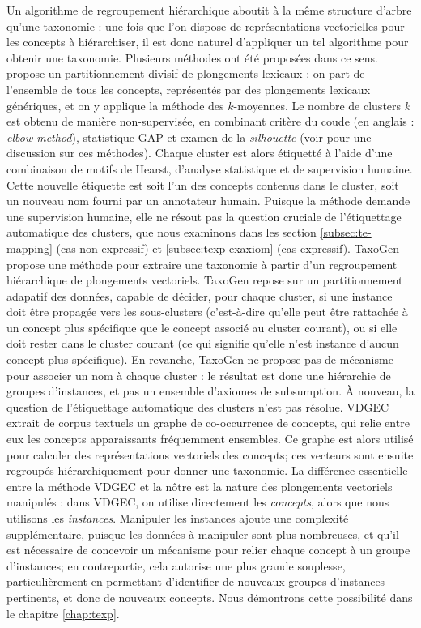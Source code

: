 Un algorithme de regroupement hiérarchique aboutit à la même structure d'arbre qu'une taxonomie : une fois que l'on dispose de représentations vectorielles pour les concepts à hiérarchiser, il est donc naturel d'appliquer un tel algorithme pour obtenir une taxonomie. Plusieurs méthodes ont été proposées dans ce sens. \cite{gupta2016domain} propose un partitionnement divisif de plongements lexicaux : on part de l'ensemble de tous les concepts, représentés par des plongements lexicaux génériques, et on y applique la méthode des $k$-moyennes. Le nombre de clusters $k$ est obtenu de manière non-supervisée, en combinant critère du coude (en anglais : \textit{elbow method}), statistique GAP et examen de la \textit{silhouette} (voir \cite[p.~126--130]{everitt2011cluster} pour une discussion sur ces méthodes). Chaque cluster est alors étiquetté à l'aide d'une combinaison de motifs de Hearst, d'analyse statistique et de supervision humaine. Cette nouvelle étiquette est soit l'un des concepts contenus dans le cluster, soit un nouveau nom fourni par un annotateur humain. Puisque la méthode demande une supervision humaine, elle ne résout pas la question cruciale de l'étiquettage automatique des clusters, que nous examinons dans les section \ref{subsec:te-mapping} (cas non-expressif) et \ref{subsec:texp-exaxiom} (cas expressif). TaxoGen \cite{zhang2018taxogen} propose une méthode pour extraire une taxonomie à partir d'un regroupement hiérarchique de plongements vectoriels. TaxoGen repose sur un partitionnement adapatif des données, capable de décider, pour chaque cluster, si une instance doit être propagée vers les sous-clusters (c'est-à-dire qu'elle peut être rattachée à un concept plus spécifique que le concept associé au cluster courant), ou si elle doit rester dans le cluster courant (ce qui signifie qu'elle n'est instance d'aucun concept plus spécifique). En revanche, TaxoGen ne propose pas de mécanisme pour associer un nom à chaque cluster : le résultat est donc une hiérarchie de groupes d'instances, et pas un ensemble d'axiomes de subsumption. À nouveau, la question de l'étiquettage automatique des clusters n'est pas résolue.
VDGEC \cite{zhang2018variational} extrait de corpus textuels un graphe de co-occurrence de concepts, qui relie entre eux les concepts apparaissants fréquemment ensembles. Ce graphe est alors utilisé pour calculer des représentations vectoriels des concepts; ces vecteurs sont ensuite regroupés hiérarchiquement pour donner une taxonomie. La différence essentielle entre la méthode VDGEC et la nôtre est la nature des plongements vectoriels manipulés : dans VDGEC, on utilise directement les \textit{concepts}, alors que nous utilisons les \textit{instances}. Manipuler les instances ajoute une complexité supplémentaire, puisque les données à manipuler sont plus nombreuses, et qu'il est nécessaire de concevoir un mécanisme pour relier chaque concept à un groupe d'instances; en contrepartie, cela autorise une plus grande souplesse, particulièrement en permettant d'identifier de nouveaux groupes d'instances pertinents, et donc de nouveaux concepts. Nous démontrons cette possibilité dans le chapitre \ref{chap:texp}.


